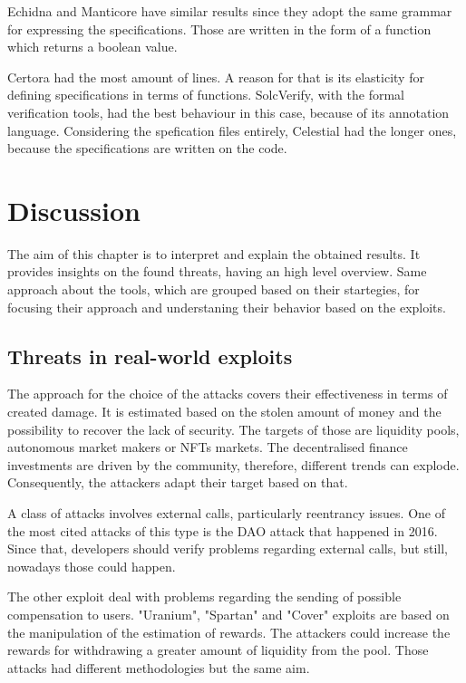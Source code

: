 Echidna and Manticore have similar results since they adopt the same grammar for expressing the specifications. 
Those are written in the form of a function which returns a boolean value.

Certora had the most amount of lines. A reason for that is its elasticity for defining specifications in terms of functions. 
SolcVerify, with the formal verification tools, had the best behaviour in this case, because of its annotation language. 
Considering the spefication files entirely, Celestial had the longer ones, because the specifications are written on the code.

\chapter{Discussion}
\label{ch:Discussion}

The aim of this chapter is to interpret and explain the obtained results. 
It provides insights on the found threats, having an high level overview. 
Same approach about the tools, which are grouped based on their startegies, for focusing their approach and understaning their behavior based on the exploits.

\section{Threats in real-world exploits}

The approach for the choice of the attacks covers their effectiveness in terms of created damage. 
It is estimated based on the stolen amount of money and the possibility to recover the lack of security. 
The targets of those are liquidity pools, autonomous market makers or NFTs markets. 
The decentralised finance investments are driven by the community, therefore, different trends can explode. 
Consequently, the attackers adapt their target based on that.

A class of attacks involves external calls, particularly reentrancy issues. 
One of the most cited attacks of this type is the DAO attack that happened in 2016. 
Since that, developers should verify problems regarding external calls, but still, nowadays those could happen. 

The other exploit deal with problems regarding the sending of possible compensation to users. 
"Uranium", "Spartan" and "Cover" exploits are based on the manipulation of the estimation of rewards. 
The attackers could increase the rewards for withdrawing a greater amount of liquidity from the pool. Those attacks had different methodologies but the same aim. 

